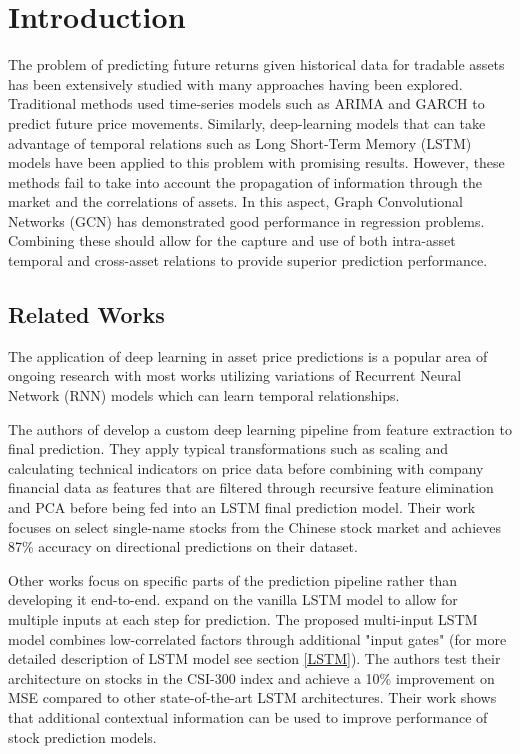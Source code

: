 \section{Introduction} \label{Introduction}

The problem of predicting future returns given historical data for tradable assets has been extensively studied 
with many approaches having been explored. Traditional methods used time-series models such as ARIMA and GARCH to predict future price movements. Similarly, deep-learning models that can take advantage of temporal relations such as Long Short-Term Memory (LSTM) models have been applied to this problem with promising results. 
However, these methods fail to take into account the propagation of information through the market and the correlations of assets. In this aspect, Graph Convolutional Networks (GCN) has demonstrated good performance in regression problems. Combining these should allow for the capture and use of both intra-asset temporal and cross-asset relations to provide superior prediction performance.

\subsection{Related Works} \label{Related Works}

The application of deep learning in asset price predictions is a popular area of ongoing research with most works utilizing variations of Recurrent Neural Network (RNN) models which can learn temporal relationships.

The authors of \cite{Shen2020} develop a custom deep learning pipeline from feature extraction to final prediction. They apply typical transformations such as scaling and calculating technical indicators on price data before combining with company financial data as features that are filtered through recursive feature elimination and PCA before being fed into an LSTM final prediction model. Their work focuses on select single-name stocks from the Chinese stock market and achieves 87\% accuracy on directional predictions on their dataset.

Other works focus on specific parts of the prediction pipeline rather than developing it end-to-end. \cite{Li2018} expand on the vanilla LSTM model to allow for multiple inputs at each step for prediction. The proposed multi-input LSTM model combines low-correlated factors through additional "input gates" (for more detailed description of LSTM model see section \ref{LSTM}). The authors test their architecture on stocks in the CSI-300 index and achieve a 10\% improvement on MSE compared to other state-of-the-art LSTM architectures. Their work shows that additional contextual information can be used to improve performance of stock prediction models.

